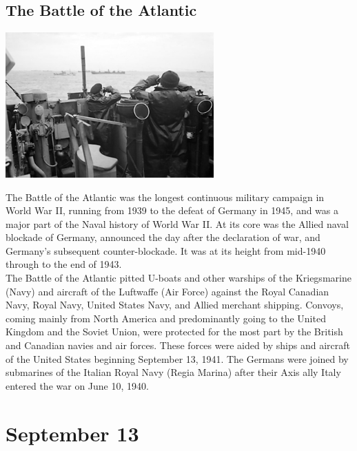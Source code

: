 \documentclass[11pt]{report}
\begin{document}
\subsection{The Battle of the Atlantic}
\vspace{2mm}\begin{center}\includegraphics[width=8cm]{./img/atlanticBattle.jpg}\end{center}
The Battle of the Atlantic was the longest continuous military campaign in World War II, running from 1939 to the defeat of Germany in 1945, and was a major part of the Naval history of World War II. At its core was the Allied naval blockade of Germany, announced the day after the declaration of war, and Germany's subsequent counter-blockade. It was at its height from mid-1940 through to the end of 1943.\\ \indent The Battle of the Atlantic pitted U-boats and other warships of the Kriegsmarine (Navy) and aircraft of the Luftwaffe (Air Force) against the Royal Canadian Navy, Royal Navy, United States Navy, and Allied merchant shipping. Convoys, coming mainly from North America and predominantly going to the United Kingdom and the Soviet Union, were protected for the most part by the British and Canadian navies and air forces. These forces were aided by ships and aircraft of the United States beginning September 13, 1941. The Germans were joined by submarines of the Italian Royal Navy (Regia Marina) after their Axis ally Italy entered the war on June 10, 1940.
\section{September 13}
\end{document}
